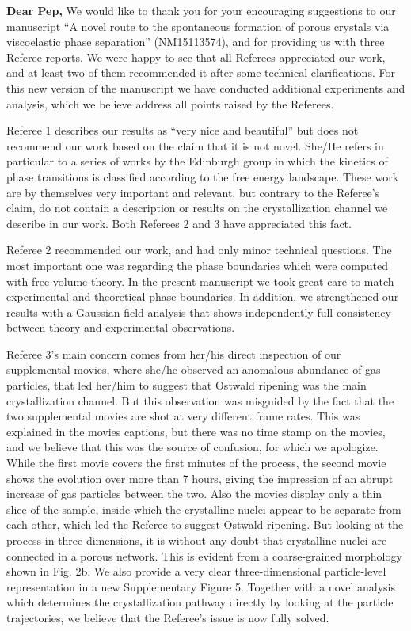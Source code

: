 \documentclass[11pt,a4paper]{article}
\begin{document}




\noindent
{\bf Dear Pep,}
\vskip 0.3cm
We would like to thank you for your encouraging suggestions to our manuscript 
``A novel route to the spontaneous formation of porous crystals via viscoelastic phase separation'' (NM15113574),
and for providing us with three Referee reports. 
We were happy to see that all Referees appreciated our work, and at least two of them recommended it after some technical clarifications.
For this new version of the manuscript we have conducted additional experiments and analysis,
which we believe address all points raised by the Referees.

Referee 1 describes our results as ``very nice and beautiful'' but does not recommend our work
based on the claim that it is not novel. She/He refers in particular to a series of works by the Edinburgh group in which the kinetics of phase
transitions is classified according to the free energy landscape. These work are by themselves very important and relevant, but contrary
to the Referee's claim, do not contain a description or results on the crystallization channel we describe in our work.
Both Referees 2 and 3 have appreciated this fact.

Referee 2 recommended our work, and had only minor technical questions. The most important one was regarding the phase boundaries
which were computed with free-volume theory. In the present manuscript we took great care to match experimental and theoretical phase boundaries. In addition, we strengthened our results with a Gaussian field analysis that shows independently full consistency between theory and experimental observations.

Referee 3's main concern comes from her/his direct inspection of our supplemental movies, where she/he observed an anomalous abundance
of gas particles, that led her/him to suggest that Ostwald ripening was the main crystallization channel. But this observation
was misguided by the fact that the two supplemental movies are shot at very different frame rates. This was explained in the movies captions,
but there was no time stamp on the movies, and we believe that this was the source of confusion, for which we apologize. While the first movie covers
the first minutes of the process, the second movie shows the evolution over more than 7 hours, giving the impression
of an abrupt increase of gas particles between the two. Also the movies display only a thin slice of the sample, inside which
the crystalline nuclei appear to be separate from each other, which led the Referee to suggest Ostwald ripening. But looking at the process in three dimensions,
it is without any doubt that crystalline nuclei are connected in a porous network. This is evident from a coarse-grained morphology shown in Fig. 2b. 
We also provide a very clear three-dimensional particle-level representation in a new Supplementary Figure 5.  
Together with a novel analysis which determines the crystallization pathway directly by looking 
at the particle trajectories, we believe that the Referee's issue is now fully solved. 
\end{document}
